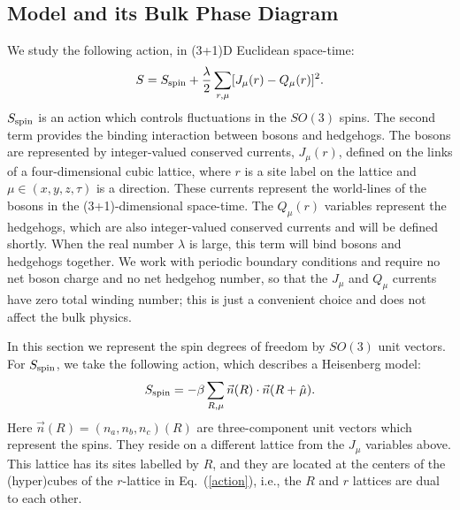 \documentclass[prb,twocolumn]{revtex4-1}
\begin{document}
\subsection{Model and its Bulk Phase Diagram}
\label{subsec::bulkheis}
We study the following action, in (3+1)D Euclidean space-time:
\begin{equation}
S=S_{\rm spin}+\frac{\lambda}{2}\sum_{r,\mu} [ J_\mu(r)- Q_\mu(r)]^2.
\label{action}
\end{equation}
$S_{\rm spin}$ is an action which controls fluctuations in the $SO(3)$ spins. The second term provides the binding interaction between bosons and hedgehogs. The bosons are represented by integer-valued conserved currents, $J_\mu(r)$, defined on the links of a four-dimensional cubic lattice, where $r$ is a site label on the lattice and $\mu\in (x,y,z,\tau)$ is a direction. These currents represent the world-lines of the bosons in the (3+1)-dimensional space-time. The $Q_\mu(r)$ variables represent the hedgehogs, which are also integer-valued conserved currents and will be defined shortly.  When the real number $\lambda$ is large, this term will bind bosons and hedgehogs together. We work with periodic boundary conditions and require no net boson charge and no net hedgehog number, so that the $J_\mu$ and $Q_\mu$ currents have zero total winding number; this is just a convenient choice and does not affect the bulk physics.

In this section we represent the spin degrees of freedom by $SO(3)$ unit vectors. For $S_{\rm spin}$, we take the following action, which describes a Heisenberg model:
\begin{equation}
S_{\rm spin}=-\beta\sum_{R,\mu} \vec{n}(R)\cdot \vec{n}(R+\hat{\mu}).
\label{SHeis}
\end{equation}
Here $\vec{n}(R)=(n_a,n_b,n_c)(R)$ are three-component unit vectors which represent the spins. They reside on a different lattice from the $J_\mu$ variables above. This lattice has its sites labelled by $R$, and they are located at the centers of the (hyper)cubes of the $r$-lattice in Eq.~(\ref{action}), i.e., the $R$ and $r$ lattices are dual to each other.  
\end{document}
